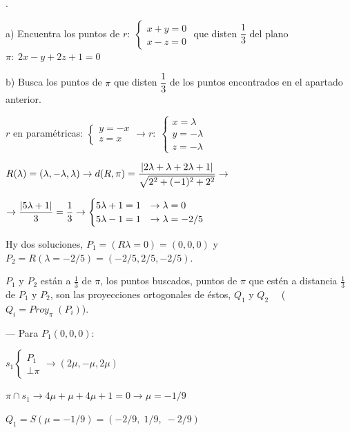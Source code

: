 \begin{ejre}.

	a) Encuentra los puntos de $r:\; \begin{cases} x+y=0\\x-z=0\end{cases}$ que disten $\dfrac 1 3 $ del plano $\pi:\; 2x-y+2z+1=0$
	
	b) Busca los puntos de $\pi$ que disten $\dfrac 1 3 $ de los puntos encontrados en el apartado anterior.
	
	
\end{ejre}
\begin{proofw}\renewcommand{\qedsymbol}{$\diamond$}	

\noindent $r$ en paramétricas: $\begin{cases} y=-x\\z=x \end{cases} \to r:\; \begin{cases}x=\lambda\\y=-\lambda\\z=-\lambda \end{cases}$

\noindent $R(\lambda)=(\lambda,-\lambda,\lambda) \to d(R,\pi)=\dfrac {\abs{2\lambda+\lambda+2\lambda+1}}{\sqrt{2^2+(-1)^2+2^2}}\to$

\noindent $\to \dfrac{\abs{5\lambda+1}}{3}=\dfrac 1 3 \to \begin{cases} 5\lambda+1=1 &\to \lambda=0 \\ 5\lambda-1=1 &\to \lambda=-2/5 \end{cases}$

\noindent Hy dos soluciones, $P_1=(R\lambda=0)=(0,0,0)$ y $P_2=R(\lambda=-2/5)=(-2/5,2/5,-2/5)$.

\noindent $P_1 \text{ y } P_2$ están a $\frac 1 3$ de $\pi$, los puntos buscados, puntos de $\pi$ que estén a distancia $\frac 1 3$ de  $P_1 \text{ y } P_2$, son las proyecciones ortogonales de éstos, $Q_1 \text{ y } Q_2\quad $ \textcolor{gris}{($Q_i=Proy_{\pi}\; (P_i)$).}

\noindent --- Para $P_1(0,0,0)$:

\noindent $s_1\begin{cases}P_1\\\bot \pi \end{cases}\to (2\mu,-\mu,2\mu)$

\noindent $\pi \cap s_1 \to 4\mu+\mu+4\mu+1=0 \to \mu=-1/9$

\noindent $Q_1=S(\mu=-1/9)=(-2/9,\; 1/9,\; -2/9)$


\end{proofw}
